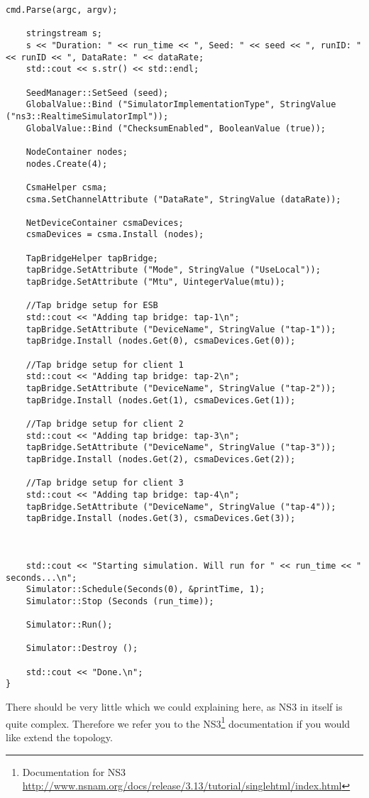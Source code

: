 \begin{lstlisting}[frame=single, caption={System-test-2 Topology}, label=mobiemu:topology, breaklines=true]
    cmd.Parse(argc, argv);
   
    stringstream s;
    s << "Duration: " << run_time << ", Seed: " << seed << ", runID: " << runID << ", DataRate: " << dataRate;
    std::cout << s.str() << std::endl;

    SeedManager::SetSeed (seed);
    GlobalValue::Bind ("SimulatorImplementationType", StringValue ("ns3::RealtimeSimulatorImpl"));
    GlobalValue::Bind ("ChecksumEnabled", BooleanValue (true));
   
    NodeContainer nodes;
    nodes.Create(4);
   
    CsmaHelper csma;
    csma.SetChannelAttribute ("DataRate", StringValue (dataRate));
   
    NetDeviceContainer csmaDevices;
    csmaDevices = csma.Install (nodes);
   
    TapBridgeHelper tapBridge;
    tapBridge.SetAttribute ("Mode", StringValue ("UseLocal"));
    tapBridge.SetAttribute ("Mtu", UintegerValue(mtu));
   
    //Tap bridge setup for ESB
    std::cout << "Adding tap bridge: tap-1\n";
    tapBridge.SetAttribute ("DeviceName", StringValue ("tap-1"));
    tapBridge.Install (nodes.Get(0), csmaDevices.Get(0));
   
    //Tap bridge setup for client 1
    std::cout << "Adding tap bridge: tap-2\n";
    tapBridge.SetAttribute ("DeviceName", StringValue ("tap-2"));
    tapBridge.Install (nodes.Get(1), csmaDevices.Get(1));
   
    //Tap bridge setup for client 2
    std::cout << "Adding tap bridge: tap-3\n";
    tapBridge.SetAttribute ("DeviceName", StringValue ("tap-3"));
    tapBridge.Install (nodes.Get(2), csmaDevices.Get(2));

    //Tap bridge setup for client 3
    std::cout << "Adding tap bridge: tap-4\n";
    tapBridge.SetAttribute ("DeviceName", StringValue ("tap-4"));
    tapBridge.Install (nodes.Get(3), csmaDevices.Get(3));
   
   
   
    std::cout << "Starting simulation. Will run for " << run_time << " seconds...\n";  
    Simulator::Schedule(Seconds(0), &printTime, 1);
    Simulator::Stop (Seconds (run_time));

    Simulator::Run();

    Simulator::Destroy ();

    std::cout << "Done.\n";
}
\end{lstlisting}

There should be very little which we could explaining here, as NS3 in itself is quite complex. Therefore we refer you to the NS3\footnote{Documentation for NS3 \url{http://www.nsnam.org/docs/release/3.13/tutorial/singlehtml/index.html}} documentation if you would like extend the topology.
